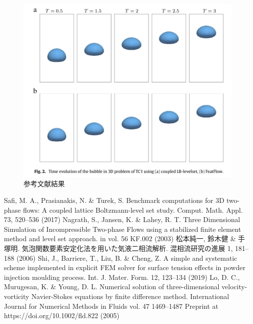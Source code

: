 \documentclass[8pt,a4paper]{article}
\begin{document}
\begin{figure}[H]
	\centering
	\includegraphics[width=10truecm]{pics/3d-bubble/result-ref.pdf}
	\caption{参考文献結果~\cite{Safi2017}}
	\label{fig:3d-bubble-result-ref}
\end{figure}

\begin{thebibliography}{99}
	 Safi, M. A., Prasianakis, N. \& Turek, S. Benchmark computations for 3D two-phase flows: A coupled lattice Boltzmann-level set study. Comput. Math. Appl. 73, 520–536 (2017)
	 Nagrath, S., Jansen, K. \& Lahey, R. T. Three Dimensional Simulation of Incompressible Two-phase Flows using a stabilized finite element method and level set approach. in vol. 56 KF.002 (2003)
	 松本純一, 鈴木健 \& 手塚明. 気泡関数要素安定化法を用いた気液二相流解析. 混相流研究の進展 1, 181–188 (2006)
	 Shi, J., Barriere, T., Liu, B. \& Cheng, Z. A simple and systematic scheme implemented in explicit FEM solver for surface tension effects in powder injection moulding process. Int. J. Mater. Form. 12, 123–134 (2019)
	 Lo, D. C., Murugesan, K. \& Young, D. L. Numerical solution of three-dimensional velocity-vorticity Navier-Stokes equations by finite difference method. International Journal for Numerical Methods in Fluids vol. 47 1469–1487 Preprint at https://doi.org/10.1002/fld.822 (2005)
\end{thebibliography}
\end{document}
